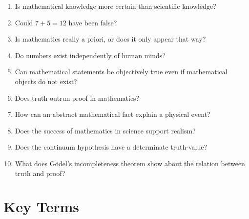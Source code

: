 \documentclass[11pt]{article}
\begin{document}
\begin{enumerate}[leftmargin=2em]
    \item Is mathematical knowledge more certain than scientific knowledge?
    \item Could \(7+5=12\) have been false?
    \item Is mathematics really a priori, or does it only appear that way?
    \item Do numbers exist independently of human minds?
    \item Can mathematical statements be objectively true even if mathematical objects do not exist?
    \item Does truth outrun proof in mathematics?
    \item How can an abstract mathematical fact explain a physical event?
    \item Does the success of mathematics in science support realism?
    \item Does the continuum hypothesis have a determinate truth-value?
    \item What does G\"odel's incompleteness theorem show about the relation between truth and proof?
\end{enumerate}

\section*{Key Terms}
\end{document}
